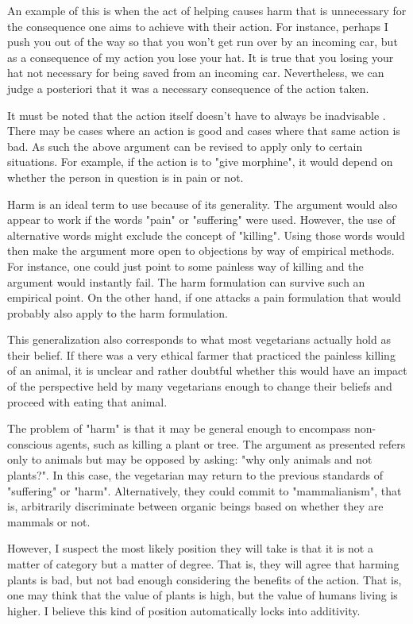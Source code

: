 An example of this is when the act of helping causes harm that is unnecessary for the consequence one aims to achieve with their action. For instance, perhaps I push you out of the way so that you won’t get run over by an incoming car, but as a consequence of my action you lose your hat. It is true that you losing your hat not necessary for being saved from an incoming car. Nevertheless, we can judge a posteriori that it was a necessary consequence of the action taken.

It must be noted that the action itself doesn’t have to always be inadvisable . There may be cases where an action is good and cases where that same action is bad. As such the above argument can be revised to apply only to certain situations. For example, if the action is to "give morphine", it would depend on whether the person in question is in pain or not. 

Harm is an ideal term to use  because of its generality. The argument would also appear to work if the words "pain" or "suffering" were used. However, the use of alternative words might exclude the concept of "killing". Using those words would then make the argument more open to objections by way of empirical methods. For instance, one could just point to some painless way of killing and the argument would instantly fail. The harm formulation can survive such an empirical point. On the other hand, if one attacks a pain formulation that would probably also apply to the harm formulation. 

This generalization also corresponds to what most vegetarians actually hold as their belief. If there was a very ethical farmer that practiced the painless killing of an animal, it is unclear and rather doubtful whether this would have an impact of the perspective held by many vegetarians enough to change their beliefs and proceed with eating that animal.

The problem of "harm" is that it may be general enough to encompass non-conscious agents, such as killing a plant or tree. The argument as presented refers only to animals but may be opposed by asking: "why only animals and not plants?". In this case, the vegetarian may return to the previous standards of "suffering" or "harm". Alternatively, they could commit to "mammalianism", that is, arbitrarily discriminate between organic beings based on whether they are mammals or not. 

However, I suspect the most likely position they will take is that it is not a matter of category but a matter of degree. That is, they will agree that harming plants is bad, but not bad enough considering the benefits of the action. That is, one may think that the value of plants is high, but the value of humans living is higher. I believe this kind of position automatically locks into additivity. 



